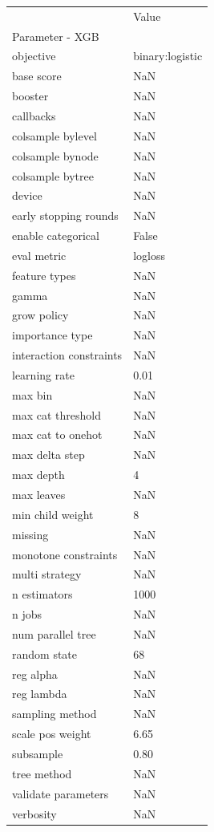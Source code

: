 \begin{tabular}{ll}
\toprule
 & Value \\
Parameter - XGB &  \\
\midrule
objective & binary:logistic \\
base score & NaN \\
booster & NaN \\
callbacks & NaN \\
colsample bylevel & NaN \\
colsample bynode & NaN \\
colsample bytree & NaN \\
device & NaN \\
early stopping rounds & NaN \\
enable categorical & False \\
eval metric & logloss \\
feature types & NaN \\
gamma & NaN \\
grow policy & NaN \\
importance type & NaN \\
interaction constraints & NaN \\
learning rate & 0.01 \\
max bin & NaN \\
max cat threshold & NaN \\
max cat to onehot & NaN \\
max delta step & NaN \\
max depth & 4 \\
max leaves & NaN \\
min child weight & 8 \\
missing & NaN \\
monotone constraints & NaN \\
multi strategy & NaN \\
n estimators & 1000 \\
n jobs & NaN \\
num parallel tree & NaN \\
random state & 68 \\
reg alpha & NaN \\
reg lambda & NaN \\
sampling method & NaN \\
scale pos weight & 6.65 \\
subsample & 0.80 \\
tree method & NaN \\
validate parameters & NaN \\
verbosity & NaN \\
\bottomrule
\end{tabular}
